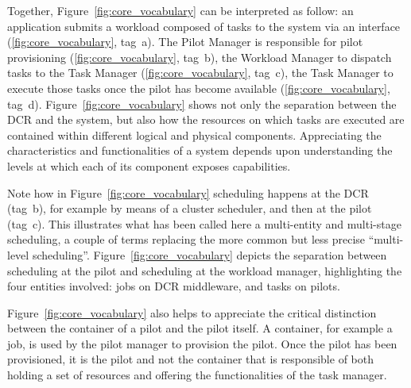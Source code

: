 \documentclass{sig-alternate}
\begin{document}
Together, Figure~\ref{fig:core_vocabulary} can be interpreted as follow: an
application submits a workload composed of tasks to the \pilot system via an
interface (\ref{fig:core_vocabulary}, tag~a). The Pilot Manager is responsible
for pilot provisioning (\ref{fig:core_vocabulary}, tag~b), the Workload Manager
to dispatch tasks to the Task Manager (\ref{fig:core_vocabulary}, tag~c), the
Task Manager to execute those tasks once the pilot has become available
(\ref{fig:core_vocabulary}, tag~d). Figure~\ref{fig:core_vocabulary} shows not
only the separation between the DCR and the \pilot system, but also how the
resources on which tasks are executed are contained within different logical
and physical components. Appreciating the characteristics and functionalities of
a \pilot system depends upon understanding the levels at which each of its
component exposes capabilities.



Note how in Figure~\ref{fig:core_vocabulary} scheduling happens at the DCR
(tag~b), for example by means of a cluster scheduler, and then at the pilot
(tag~c). This illustrates what has been called here a multi-entity and
multi-stage scheduling, a couple of terms replacing the more common but less
precise ``multi-level scheduling''.  Figure~\ref{fig:core_vocabulary} depicts
the separation between scheduling at the pilot and scheduling at the workload
manager, highlighting the four entities involved: jobs on DCR middleware, and
tasks on pilots.


Figure~\ref{fig:core_vocabulary} also helps to appreciate the critical
distinction between the container of a pilot and the pilot itself. A container,
for example a job, is used by the pilot manager to provision the pilot. Once the
pilot has been provisioned, it is the pilot and not the container that is
responsible of both holding a set of resources and offering the functionalities
of the task manager.
\end{document}
